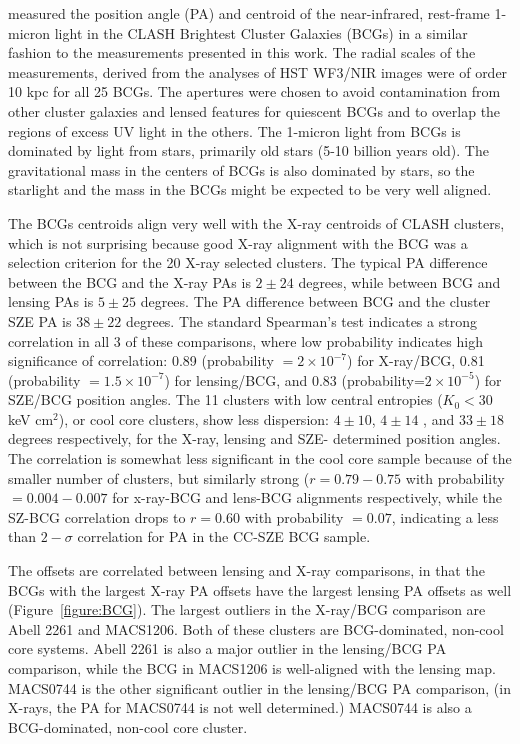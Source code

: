 \documentclass[iop,twocolumn]{emulateapj}
\begin{document}
{\citet{2015ApJ...805..177D} measured the position angle (PA) and centroid of the near-infrared, rest-frame 1-micron light in the CLASH Brightest
Cluster Galaxies (BCGs) in 
a similar fashion to the measurements presented in this work. The radial scales of the measurements, derived from the
analyses of HST WF3/NIR images were of order 10 kpc for all 25 BCGs. The apertures were chosen to avoid contamination from
other cluster galaxies and lensed features for quiescent BCGs and to overlap the regions of excess UV light in 
the others. 
The 1-micron light from BCGs is dominated by light from stars, primarily old
stars (5-10 billion years old). The gravitational mass in the centers of BCGs is also dominated by stars, so the starlight
and the mass in the BCGs might be expected to be very well aligned.

The BCGs centroids align very well with the X-ray centroids of CLASH clusters, which is not surprising because 
good X-ray alignment with the BCG was a selection criterion for the 20 X-ray selected clusters. 
The typical PA difference between the BCG and the X-ray PAs is $2 \pm 24$ degrees, while
between BCG and lensing PAs is $5 \pm 25$ degrees. The  PA difference between BCG and the cluster SZE PA is $38 \pm 22$ degrees. 
The standard Spearman's test indicates a strong correlation in all 3 of these comparisons, where low
probability indicates high significance of correlation: 0.89 (probability $=2 \times 10^{-7}$) for X-ray/BCG,
0.81 (probability $=1.5 \times 10^{-7}$) for lensing/BCG, and 0.83 (probability=$2 \times 10^{-5}$) for SZE/BCG position angles. 
The 11 clusters with low central entropies ($K_0 < 30$ keV cm$^{2}$), or
cool core clusters, show less dispersion: $4 \pm 10$, $4 \pm 14$ , and $33 \pm 18$ degrees respectively, for the X-ray, lensing and 
SZE- determined position 
angles. The correlation is somewhat less significant in the cool core sample because of the smaller number of clusters, 
but similarly strong ($r=0.79-0.75$ with probability $=0.004-0.007$ for x-ray-BCG and lens-BCG
alignments respectively, while the SZ-BCG correlation drops to $r=0.60$ with probability $=0.07$, indicating a less
than $2-\sigma$ correlation for PA in the CC-SZE BCG sample.

The offsets are correlated between lensing and X-ray comparisons, in that the
BCGs with the largest X-ray PA offsets have the largest lensing PA offsets as well (Figure~\ref{figure:BCG}).
The largest outliers in the X-ray/BCG comparison are Abell 2261 and MACS1206. Both of these clusters are BCG-dominated,
non-cool core systems. Abell 2261 is also a major outlier in the lensing/BCG PA comparison, while the BCG in MACS1206
is well-aligned with the lensing map. MACS0744 is the other significant outlier in the lensing/BCG PA comparison,
(in X-rays, the PA for MACS0744 is not well determined.) MACS0744 is also a BCG-dominated, non-cool core cluster.


}
\end{document}
